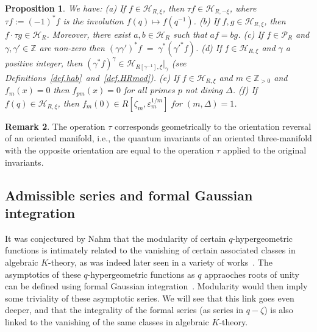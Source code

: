 \documentclass[12pt,reqno]{amsart}
\newtheorem{proposition}{Proposition}[section]
\theoremstyle{definition}
\newtheorem{remark}[proposition]{Remark}
\def\BZ{\mathbb Z}
\def\calP{\mathcal P}
\def\calH{\mathcal H}
\def\ve{\varepsilon}
\def\z{\zeta}
\def\={\;=\;}
\begin{document}
\begin{proposition}
\label{prop.HRxi}
We have: 
\newline
\emph{(}a\emph{)}
  If $f \in \calH_{R,\xi}$, then $\tau f \in \calH_{R,-\xi}$, where
  $\tau f := (-1)^* f$ is the involution $f(q) \mapsto f(q^{-1})$.
\newline
\emph{(}b\emph{)}
  If $f,g \in \calH_{R,\xi}$, then $f \cdot\tau g \in \calH_{R}$. Moreover,
  there exist $a, b \in \calH_{R}$ such that $af=bg$.
\newline
\emph{(}c\emph{)}
  If $f\in\calP_R$ and $\gamma,\gamma'\in\BZ$ are non-zero then $(\gamma \gamma')^* f
  \= \gamma^* (\gamma'^* f)$.
\newline
\emph{(}d\emph{)}
  If $f \in \calH_{R,\xi}$ and $\gamma$ a positive integer, then
  $(\gamma^* f)^\gamma \in \calH_{R[\gamma^{-1}],\xi}|_{\gamma}$
  (see Definitions~\ref{def.hab}~and~\ref{def.HRmod}).
\newline
\emph{(}e\emph{)}
If $f\in\calH_{R,\xi}$ and $m\in\BZ_{>0}$ and $f_m(x)=0$ then $f_{pm}(x)=0$
for all primes $p$ not diving $\Delta$.
\newline
\emph{(}f\emph{)}
  If $f(q) \in \calH_{R,\xi}$, then 
  $f_m(0) \in R[\z_m,\ve_m^{1/m}]$ for $(m,\Delta)=1$. 
\end{proposition}

\begin{remark}
The operation $\tau$ corresponds geometrically to the orientation reversal of an
oriented manifold, i.e., the quantum invariants of an oriented three-manifold with
the opposite orientation are equal to the operation $\tau$ applied to the original
invariants.
\end{remark}

\subsection{Admissible series and formal Gaussian integration}
\label{sub.admFGI}
It was conjectured by Nahm that the modularity of certain $q$-hypergeometric
functions is intimately related to the vanishing of certain associated classes in
algebraic $K$-theory, as was indeed later seen in a variety of
works~\cite{Nahm,Zagier:dilog,GZ:asymptotics,CGZ}.
The asymptotics of these $q$-hypergeometric functions as $q$ appraoches roots of
unity can be defined using formal Gaussian integration~\cite{Zagier:dilog,DG,DG2}.
Modularity would then imply some triviality of these asymptotic series.
We will see that this link goes even deeper, and that the
integrality of the formal series (as series in $q-\z$) is also linked to the
vanishing of the same classes in algebraic $K$-theory.
\end{document}
